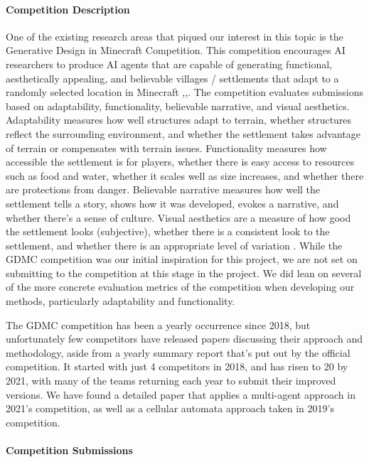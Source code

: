 \documentclass[11pt, oneside]{article}
\begin{document}
\begin{normalsize}
\paragraph{Competition Description}

One of the existing research areas that piqued our interest in this topic is the Generative Design in Minecraft Competition. This competition encourages AI researchers to produce AI agents that are capable of generating functional, aesthetically appealing, and believable villages / settlements that adapt to a randomly selected location in Minecraft \cite{salge_ai_2020},\cite{salge_generative_2018},\cite{salge_generative_2019}. The competition evaluates submissions based on adaptability, functionality, believable narrative, and visual aesthetics. Adaptability measures how well structures adapt to terrain, whether structures reflect the surrounding environment, and whether the settlement takes advantage of terrain or compensates with terrain issues. Functionality measures how accessible the settlement is for players, whether there is easy access to resources such as food and water, whether it scales well as size increases, and whether there are protections from danger. Believable narrative measures how well the settlement tells a story, shows how it was developed, evokes a narrative, and whether there's a sense of culture. Visual aesthetics are a measure of how good the settlement looks (subjective), whether there is a consistent look to the settlement, and whether there is an appropriate level of variation \cite{salge_ai_2020}. While the GDMC competition was our initial inspiration for this project, we are not set on submitting to the competition at this stage in the project. We did lean on several of the more concrete evaluation metrics of the competition when developing our methods, particularly adaptability and functionality.

The GDMC competition has been a yearly occurrence since 2018, but unfortunately few competitors have released papers discussing their approach and methodology, aside from a yearly summary report that's put out by the official competition. It started with just 4 competitors in 2018, and has risen to 20 by 2021, with many of the teams returning each year to submit their improved versions. We have found a detailed paper that applies a multi-agent approach in 2021's competition, as well as a cellular automata approach taken in 2019's competition.

\paragraph{Competition Submissions}


\end{normalsize}
\end{document}
